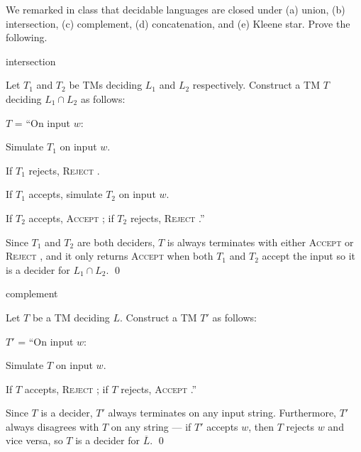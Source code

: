 
\def \Accept { \textsc{Accept} }
\def \Reject { \textsc{Reject} }
\def \Return { \textsc{Return} }
\def \List { \textsc{List} }
\begin{problem}
  We remarked in class that decidable languages are closed under
  (a) union, (b) intersection, (c) complement, (d) concatenation, and
  (e) Kleene star.  Prove the following.
  \begin{enumalph}
    \setcounter{enumi}{1}
    \item intersection
    \begin{Answer}
      Let $T_1$ and $T_2$ be TMs deciding $L_1$ and $L_2$ respectively.
      Construct a TM $T$ deciding $L_1 \cap L_2$ as follows:
      
      \step
      $T$ = ``On input $w$:
        \begin{enumarabic}
          \item Simulate $T_1$ on input $w$.
          \item If $T_1$ rejects, \Reject.
          \item If $T_1$ accepts, simulate $T_2$ on input $w$.
          \item If $T_2$ accepts, \Accept;
                if $T_2$ rejects, \Reject.''
        \end{enumarabic}
      
        \step
      Since $T_1$ and $T_2$ are both deciders, $T$ is always terminates
      with either \Accept or \Reject, and it only returns \Accept when both
      $T_1$ and $T_2$ accept the input so it is a decider for $L_1 \cap L_2$.
      \qed
    \end{Answer}

    \newpage
    \item complement
    \begin{Answer}
      Let $T$ be a TM deciding $L$.  Construct a TM $T'$ as follows:

      \step
      $T'$ = ``On input $w$:
        \begin{enumarabic}
          \item Simulate $T$ on input $w$.
          \item If $T$ accepts, \Reject;
                if $T$ rejects, \Accept.''
        \end{enumarabic}

      \step
      Since $T$ is a decider, $T'$ always terminates on any input string.
      Furthermore, $T'$ always disagrees with $T$ on any string ---
      if $T'$ accepts $w$, then $T$ rejects $w$ and vice versa,
      so $T$ is a decider for $\overline{L}$.  \qed
    \end{Answer}
    

\end{enumalph}
\end{problem}

